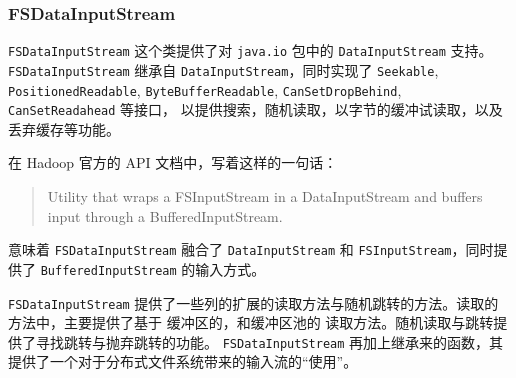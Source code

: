 
\subsubsection{FSDataInputStream}
\label{sec:uml:input:fsdatainputstream}

\lstinline{FSDataInputStream} 这个类提供了对 \lstinline|java.io| 包中的 \lstinline|DataInputStream| 支持。
\lstinline{FSDataInputStream} 继承自 \lstinline|DataInputStream|，同时实现了 \lstinline|Seekable|, \lstinline|PositionedReadable|, \lstinline|ByteBufferReadable|, \lstinline|CanSetDropBehind|, \lstinline|CanSetReadahead| 等接口，
以提供搜索，随机读取，以字节的缓冲试读取，以及丢弃缓存等功能。

在 Hadoop 官方的 API 文档中，写着这样的一句话：
\begin{quote}
    Utility that wraps a FSInputStream in a DataInputStream and buffers input through a BufferedInputStream.
\end{quote}
意味着 \lstinline|FSDataInputStream| 融合了 \lstinline|DataInputStream| 和 \lstinline|FSInputStream|，同时提供了
\lstinline|BufferedInputStream| 的输入方式。

\lstinline|FSDataInputStream| 提供了一些列的扩展的读取方法与随机跳转的方法。读取的方法中，主要提供了基于 缓冲区的，和缓冲区池的
读取方法。随机读取与跳转提供了寻找跳转与抛弃跳转的功能。
\lstinline|FSDataInputStream| 再加上继承来的函数，其提供了一个对于分布式文件系统带来的输入流的“使用”。


